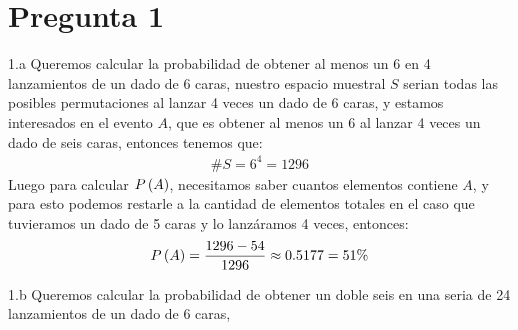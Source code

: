 
\section*{Pregunta 1}

1.a Queremos calcular la probabilidad de obtener al menos un 6 en 4 lanzamientos de un dado de 6 caras, nuestro espacio muestral $S$ serian todas las posibles permutaciones al lanzar 4 veces un dado de 6 caras, y estamos interesados en el evento $A$, que es obtener al menos un 6 al lanzar 4 veces un dado de seis caras, entonces tenemos que:
\begin{align*}
	\#S = 6^4 = 1296
\end{align*}
Luego para calcular ${P} \left( {A} \right)$, necesitamos saber cuantos elementos contiene $A$, y para esto podemos restarle a la cantidad de elementos totales en el caso que tuvieramos un dado de 5 caras y lo lanzáramos 4 veces, entonces:
\begin{align*}
	{P} \left( {A} \right) = \frac{1296 - 54}{1296} \approx 0.5177 = 51\%
\end{align*}


1.b Queremos calcular la probabilidad de obtener un doble seis en una seria de 24 lanzamientos de un dado de 6 caras,
